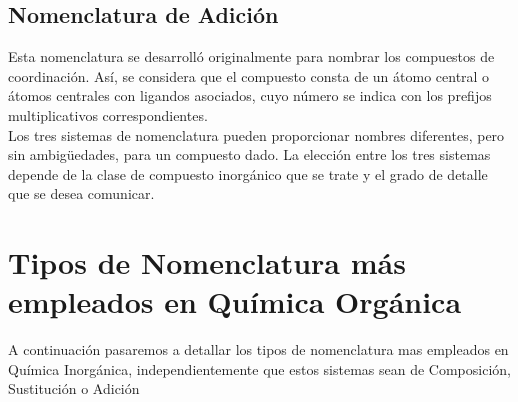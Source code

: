 \documentclass[11pt,fleqn]{book} %
\begin{document}
\subsection{Nomenclatura de Adición}
Esta nomenclatura se desarrolló originalmente para nombrar los compuestos de coordinación. Así, se considera que el compuesto consta de un átomo central o átomos centrales con ligandos asociados, cuyo número se indica con los prefijos multiplicativos correspondientes.\\
Los tres sistemas de nomenclatura pueden proporcionar nombres diferentes, pero sin  ambigüedades, para un compuesto dado. La elección entre los tres sistemas depende de la clase de compuesto inorgánico que se trate y el grado de detalle que se desea comunicar.
\section{Tipos de Nomenclatura más empleados en Química Orgánica}
A continuación pasaremos a detallar los tipos de nomenclatura mas empleados en Química Inorgánica, independientemente que estos sistemas sean de Composición, Sustitución o Adición\\
\end{document}
